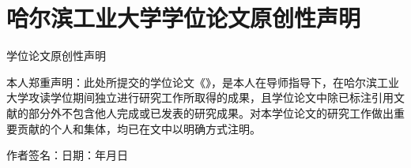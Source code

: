 \chapter*{哈尔滨工业大学学位论文原创性声明}
{}

\vspace{\baselineskip}
\begin{center}{\xiaosan \heiti 学位论文原创性声明}\end{center}
\vspace{1em}

本人郑重声明：此处所提交的学位论文《\ctitle》，是本人在导师指导下，在哈尔滨工业大学攻读学位期间独立进行研究工作所取得的成果，且学位论文中除已标注引用文献的部分外不包含他人完成或已发表的研究成果。对本学位论文的研究工作做出重要贡献的个人和集体，均已在文中以明确方式注明。

\vspace{\baselineskip}
\hspace{6em}作者签名：\hfill 日期：\hspace{2.5em}年\hspace{1.5em}月\hspace{1.5em}日
